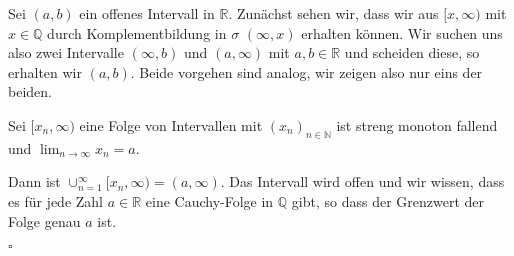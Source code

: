 \documentclass[11pt,a4paper,ngerman]{article}
\begin{document}
Sei $(a,b)$ ein offenes Intervall in $\mathbb{R}$. Zunächst sehen wir,
dass wir aus $[x, \infty)$ mit $x \in \mathbb{Q}$ durch Komplementbildung in $\sigma$ $(\infty, x)$ erhalten können.
Wir suchen uns also zwei Intervalle $(\infty, b)$ und $(a, \infty)$ mit $a,b \in \mathbb{R}$ und scheiden diese, so erhalten wir $(a,b)$. Beide vorgehen sind
analog, wir zeigen also nur eins der beiden.


Sei $[x_n, \infty)$ eine Folge von Intervallen mit $(x_n)_{n \in \mathbb{N}}$
ist streng monoton fallend und $\lim_{n\rightarrow\infty} x_n = a$.

Dann ist $\cup_{n=1}^\infty [x_n, \infty) = (a, \infty)$. Das Intervall wird
offen und wir wissen, dass es für jede Zahl $a \in \mathbb{R}$ eine Cauchy-Folge in $\mathbb{Q}$ gibt, so dass der Grenzwert der Folge genau $a$ ist.

\mbox{}\hfill$\square$

\label{LastPage}
\end{document}

